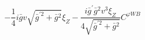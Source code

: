 %
\begin{dmath*}
%
  -  \frac{1}{4} i {\bar g}{} v \sqrt{{\bar g}^{\prime 2} + {\bar g}{}^2} \xi_Z   -  \frac{i {\bar g}^\prime {\bar g}{}^2 v^3 \xi_Z}{4 \sqrt{{\bar g}^{\prime 2} + {\bar g}{}^2}}C^{ \varphi  WB}
%
\end{dmath*}
%
